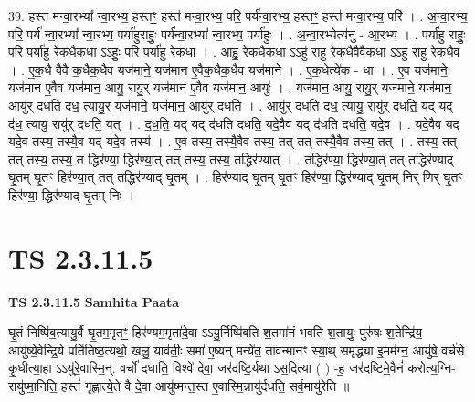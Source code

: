 \documentclass[17pt]{extarticle}
\begin{document}
39. हस्त॑ मन्वा॒रभ्या᳚ न्वा॒रभ्य॒ हस्तꣳ॒॒ हस्त॑ मन्वा॒रभ्य॒ परि॒ पर्य॑न्वा॒रभ्य॒ हस्तꣳ॒॒ हस्त॑ मन्वा॒रभ्य॒ परि॑ । . अ॒न्वा॒रभ्य॒ परि॒ पर्य॑ न्वा॒रभ्या᳚ न्वा॒रभ्य॒ पर्या॑हुराहुः॒ पर्य॑न्वा॒रभ्या᳚ न्वा॒रभ्य॒ पर्या॑हुः । . अ॒न्वा॒रभ्येत्य॑नु - आ॒रभ्य॑ । . पर्या॑हु राहुः॒ परि॒ पर्या॑हु रेक॒धैक॒धा ऽऽहुः॒ परि॒ पर्या॑हु रेक॒धा । . आ॒हु॒ रे॒क॒धैक॒धा ऽऽहु॑ राहु रेक॒धैवैवैक॒धा ऽऽहु॑ राहु रेक॒धैव । . ए॒क॒धै वैवै क॒धैक॒धैव यज॑माने॒ यज॑मान ए॒वैक॒धैक॒धैव यज॑माने । . ए॒क॒धेत्ये॑क - धा । . ए॒व यज॑माने॒ यज॑मान ए॒वैव यज॑मान॒ आयु॒ रायु॒र् यज॑मान ए॒वैव यज॑मान॒ आयुः॑ । . यज॑मान॒ आयु॒ रायु॒र् यज॑माने॒ यज॑मान॒ आयु॑र् दधति दध॒ त्यायु॒र् यज॑माने॒ यज॑मान॒ आयु॑र् दधति । . आयु॑र् दधति दध॒ त्यायु॒ रायु॑र् दधति॒ यद् यद् द॑ध॒ त्यायु॒ रायु॑र् दधति॒ यत् । . द॒ध॒ति॒ यद् यद् द॑धति दधति॒ यदे॒वैव यद् द॑धति दधति॒ यदे॒व । . यदे॒वैव यद् यदे॒व तस्य॒ तस्यै॒व यद् यदे॒व तस्य॑ । . ए॒व तस्य॒ तस्यै॒वैव तस्य॒ तत् तत् तस्यै॒वैव तस्य॒ तत् । . तस्य॒ तत् तत् तस्य॒ तस्य॒ त द्धिर॑ण्या॒ द्धिर॑ण्या॒त् तत् तस्य॒ तस्य॒ तद्धिर॑ण्यात् । . तद्धिर॑ण्या॒ द्धिर॑ण्या॒त् तत् तद्धिर॑ण्याद् घृ॒तम् घृ॒तꣳ हिर॑ण्या॒त् तत् तद्धिर॑ण्याद् घृ॒तम् । . हिर॑ण्याद् घृ॒तम् घृ॒तꣳ हिर॑ण्या॒ द्धिर॑ण्याद् घृ॒तम् निर् णिर् घृ॒तꣳ हिर॑ण्या॒ द्धिर॑ण्याद् घृ॒तम् निः । \newline
\pagebreak
{}
\section*{ TS 2.3.11.5 }

\textbf{TS 2.3.11.5 } \newline
\textbf{Samhita Paata} \newline

घृ॒तं निष्पि॑ब॒त्यायु॒र्वै घृ॒तम॒मृतꣳ॒॒ हिर॑ण्यम॒मृता॑दे॒वा ऽऽयु॒र्निष्पि॑बति श॒तमा॑नं भवति श॒तायुः॒ पुरु॑षः श॒तेन्द्रि॑य॒ आयु॑ष्ये॒वेन्द्रि॒ये प्रति॑तिष्ठ॒त्यथो॒ खलु॒ याव॑तीः॒ समा॑ ए॒ष्यन् मन्ये॑त॒ ताव॑न्मानꣳ स्या॒थ् समृ॑द्ध्या इ॒मम॑ग्न॒ आयु॑षे॒ वर्च॑से कृ॒धीत्या॒हा ऽऽयु॑रे॒वास्मि॒न्. वर्चो॑ दधाति॒ विश्वे॑ देवा॒ जर॑दष्टि॒र्यथा ऽस॒दित्या॑ ( ) -ह॒ जर॑दष्टिमे॒वैनं॑ करोत्य॒ग्नि-रायु॑ष्मा॒निति॒ हस्तं॑ गृह्णात्ये॒ते वै दे॒वा आयु॑ष्मन्त॒स्त ए॒वास्मि॒न्नायु॑र्दधति॒ सर्व॒मायु॑रेति ॥ \newline
\end{document}
